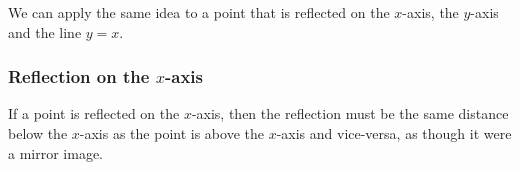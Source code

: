     \addtocounter{footnote}{-0}
    
        \par 
        \label{m39358*id71197}We can apply the same idea to a point that is reflected on the $x$-axis, the \begin{math}y\end{math}-axis and the line \begin{math}y=x\end{math}.\par 
        \label{m39358*uid7354}
            \subsubsection{ Reflection on the $x$-axis}
            \nopagebreak
            
          
          \label{m39358*id71251}If a point is reflected on the $x$-axis, then the reflection must be the same distance below the \begin{math}x\end{math}-axis as the point is above the \begin{math}x\end{math}-axis and vice-versa, as though it were a mirror image.\par 
          
    \setcounter{subfigure}{0}


